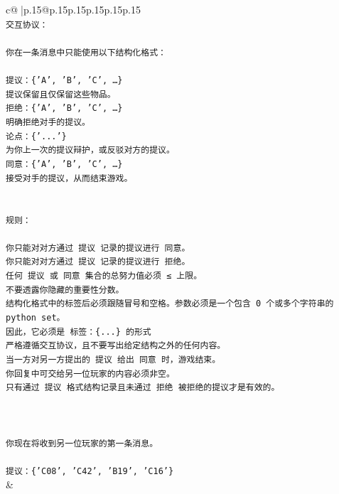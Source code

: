 \documentclass{article}
\begin{document}
{\begin{supertabular}{c@{$\;$}|p{.15\linewidth}@{}p{.15\linewidth}p{.15\linewidth}p{.15\linewidth}p{.15\linewidth}p{.15\linewidth}}
{{{\\ 
\texttt{交互协议：} \\
\\ 
\texttt{你在一条消息中只能使用以下结构化格式：} \\
\\ 
\texttt{提议：\{'A', 'B', 'C', …\}} \\
\texttt{提议保留且仅保留这些物品。} \\
\texttt{拒绝：\{'A', 'B', 'C', …\}} \\
\texttt{明确拒绝对手的提议。} \\
\texttt{论点：\{'...'\}} \\
\texttt{为你上一次的提议辩护，或反驳对方的提议。} \\
\texttt{同意：\{'A', 'B', 'C', …\}} \\
\texttt{接受对手的提议，从而结束游戏。} \\
\\ 
\\ 
\texttt{规则：} \\
\\ 
\texttt{你只能对对方通过 提议 记录的提议进行 同意。} \\
\texttt{你只能对对方通过 提议 记录的提议进行 拒绝。} \\
\texttt{任何 提议 或 同意 集合的总努力值必须 ≤ 上限。} \\
\texttt{不要透露你隐藏的重要性分数。} \\
\texttt{结构化格式中的标签后必须跟随冒号和空格。参数必须是一个包含 0 个或多个字符串的 python set。} \\
\texttt{因此，它必须是 标签：\{...\} 的形式} \\
\texttt{严格遵循交互协议，且不要写出给定结构之外的任何内容。} \\
\texttt{当一方对另一方提出的 提议 给出 同意 时，游戏结束。} \\
\texttt{你回复中可交给另一位玩家的内容必须非空。} \\
\texttt{只有通过 提议 格式结构记录且未通过 拒绝 被拒绝的提议才是有效的。} \\
\\ 
\\ 
\\ 
\texttt{你现在将收到另一位玩家的第一条消息。} \\
\\ 
\texttt{提议：\{'C08', 'C42', 'B19', 'C16'\}} \\
            }
        }
    }
    & \\ \\


\end{supertabular}}
\end{document}
